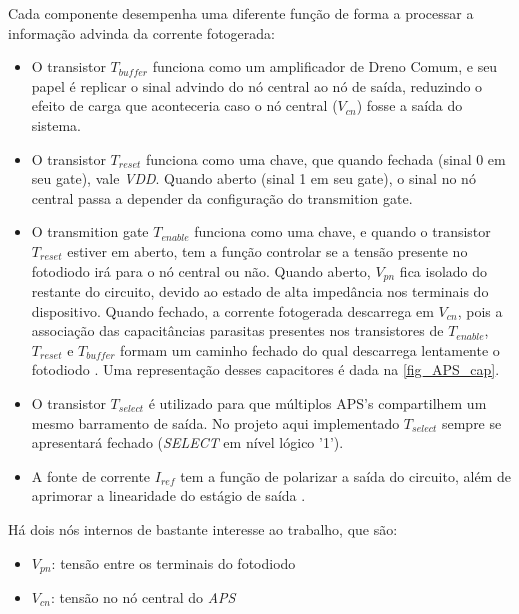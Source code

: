 Cada componente desempenha uma diferente fun{\c c}\~ao de forma a processar a informação advinda da corrente fotogerada:

\begin{itemize}

    \item O transistor \emph{$T_{buffer}$} funciona como um amplificador de Dreno Comum, e seu papel \'e replicar o sinal advindo do n\'o central ao n\'o de sa\'ida, reduzindo o efeito de carga que aconteceria caso o n\'o central ($V_{cn}$) fosse a saída do sistema.

    \item O transistor \emph{$T_{reset}$} funciona como uma chave, que quando fechada (sinal 0 em seu gate), vale \emph{VDD}. Quando aberto (sinal 1 em seu gate), o sinal no n\'o central passa a depender da configuração do transmition gate.

    \item O transmition gate \emph{$T_{enable}$} funciona como uma chave, e quando o transistor \emph{$T_{reset}$} estiver em aberto, tem a função controlar se a tensão presente no fotodiodo ir\'a para o nó central ou n\~ao. Quando aberto, $V_{pn}$ fica isolado do restante do circuito, devido ao estado de alta imped\^ancia nos terminais do dispositivo. Quando fechado, a corrente fotogerada descarrega em $V_{cn}$, pois a associação das capacitâncias parasitas presentes nos transistores de \emph{$T_{enable}$}, \emph{$T_{reset}$} e \emph{$T_{buffer}$} formam um caminho fechado do qual descarrega lentamente o fotodiodo \cite{LidianeCampos}. Uma representa{\c c}\~ao desses capacitores \'e dada na \autoref{fig_APS_cap}.
    
    \item O transistor \emph{$T_{select}$} \'e utilizado para que m\'ultiplos APS's compartilhem um mesmo barramento de sa\'ida. No projeto aqui implementado \emph{$T_{select}$} sempre se apresentar\'a fechado (\emph{SELECT} em n\'ivel l\'ogico '1').
    
    \item A fonte de corrente \emph{$I_{ref}$} tem a fun{\c c}\~ao de polarizar a sa\'ida do circuito, além de aprimorar a linearidade do estágio de sa\'ida \cite{RazaviFundM}.

\end{itemize}

    H\'a dois n\'os internos de bastante interesse ao trabalho, que s\~ao:

\begin{itemize}
    \item \emph{$V_{pn}$}: tens\~ao entre os terminais do fotodiodo
    \item \emph{$V_{cn}$}: tens\~ao no n\'o central do \emph{APS}
\end{itemize}

